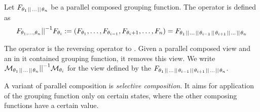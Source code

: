 \documentclass[preview]{standalone}
\begin{document}
\begin{definition}
	Let $\grpfct[\viewppty_1 \pll \dots \pll \viewppty_n]$ be a parallel composed grouping function. The operator \pllrev is defined as
	\[
	\grpfct[\viewppty_1, \dots, \viewppty_n] \pllrev \grpfct[\viewppty_i] := (\grpfct[\viewppty_1], \dots, \grpfct[\viewppty_{i-1}],\grpfct[\viewppty_i+1], \dots, \grpfct[n]) = \grpfct[\viewppty_1 \pll \dots \pll \viewppty_{i-1} \pll \viewppty_{i+1} \pll \dots \pll \viewppty_n]
	\]
	\label{def:pllrev}
\end{definition}

The operator \pllrev is the reversing operator to \pll. Given a parallel composed view and an in it contained grouping function, it removes this view. We write $\view[\viewppty_1 \pll \dots \pll \viewppty_n] \pllrev \view[\viewppty_i]$ for the view defined by the \grpfctN $\grpfct[\viewppty_1 \pll \dots \pll \viewppty_{i-1} \pll \viewppty_{i+1} \pll \dots \pll \viewppty_n]$.

A variant of parallel composition is \emph{selective composition}. It aims for application of the grouping function only on certain states, where the other composing functions have a certain value.
\end{document}
